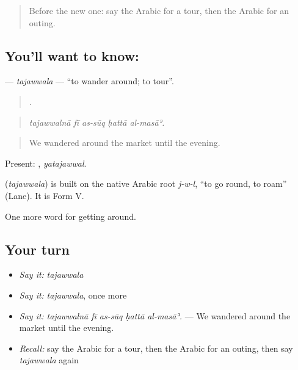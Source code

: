 \begin{quote}
Before the new one: say the Arabic for a tour, then the Arabic for an outing.
\end{quote}

\subsection*{You'll want to know: }
\textbf{} — \emph{tajawwala} — \textquotedblleft{}to wander around; to tour\textquotedblright{}.

\begin{quote}
    .
\end{quote}

\begin{quote}
\emph{tajawwalnā fī as-sūq ḥattā al-masāʾ.}
\end{quote}

\begin{quote}
We wandered around the market until the evening.
\end{quote}

Present: , \emph{yatajawwal}.

\begin{cousinweb}
\textbf{} (\emph{tajawwala}) is built on the native Arabic root \emph{j-w-l}, \textquotedblleft{}to go round, to roam\textquotedblright{} (Lane). It is Form V.
\end{cousinweb}

\begin{grammarlens}[title={What you've built}]
One more word for getting around.
\end{grammarlens}

\subsection*{Your turn}
\begin{itemize}
\raggedright
  \item \emph{Say it:} \emph{tajawwala}
  \item \emph{Say it:} \emph{tajawwala}, once more
  \item \emph{Say it:} \emph{tajawwalnā fī as-sūq ḥattā al-masāʾ.} — We wandered around the market until the evening.
  \item \emph{Recall:} say the Arabic for a tour, then the Arabic for an outing, then say \emph{tajawwala} again
\end{itemize}

